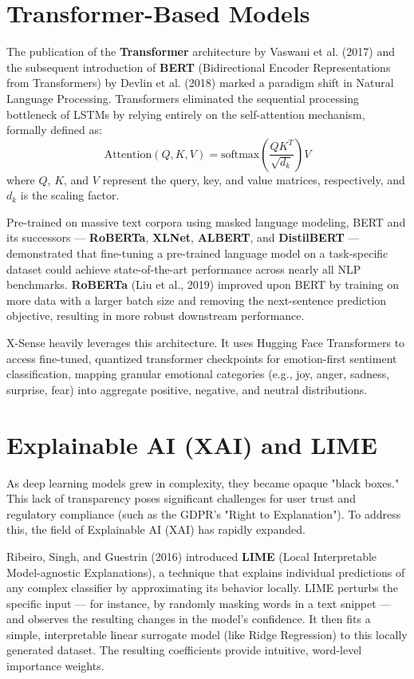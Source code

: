 \documentclass[12pt, a4paper]{report}
\begin{document}
\section{Transformer-Based Models}

The publication of the \textbf{Transformer} architecture by Vaswani et al. (2017) and the subsequent introduction of \textbf{BERT} (Bidirectional Encoder Representations from Transformers) by Devlin et al. (2018) marked a paradigm shift in Natural Language Processing. Transformers eliminated the sequential processing bottleneck of LSTMs by relying entirely on the self-attention mechanism, formally defined as:
$$ \text{Attention}(Q, K, V) = \text{softmax}\left(\frac{QK^T}{\sqrt{d_k}}\right)V $$
where $Q$, $K$, and $V$ represent the query, key, and value matrices, respectively, and $d_k$ is the scaling factor.

Pre-trained on massive text corpora using masked language modeling, BERT and its successors --- \textbf{RoBERTa}, \textbf{XLNet}, \textbf{ALBERT}, and \textbf{DistilBERT} --- demonstrated that fine-tuning a pre-trained language model on a task-specific dataset could achieve state-of-the-art performance across nearly all NLP benchmarks. \textbf{RoBERTa} (Liu et al., 2019) improved upon BERT by training on more data with a larger batch size and removing the next-sentence prediction objective, resulting in more robust downstream performance. 

X-Sense heavily leverages this architecture. It uses Hugging Face Transformers to access fine-tuned, quantized transformer checkpoints for emotion-first sentiment classification, mapping granular emotional categories (e.g., joy, anger, sadness, surprise, fear) into aggregate positive, negative, and neutral distributions.

\section{Explainable AI (XAI) and LIME}

As deep learning models grew in complexity, they became opaque "black boxes." This lack of transparency poses significant challenges for user trust and regulatory compliance (such as the GDPR's "Right to Explanation"). To address this, the field of Explainable AI (XAI) has rapidly expanded.

Ribeiro, Singh, and Guestrin (2016) introduced \textbf{LIME} (Local Interpretable Model-agnostic Explanations), a technique that explains individual predictions of any complex classifier by approximating its behavior locally. LIME perturbs the specific input --- for instance, by randomly masking words in a text snippet --- and observes the resulting changes in the model's confidence. It then fits a simple, interpretable linear surrogate model (like Ridge Regression) to this locally generated dataset. The resulting coefficients provide intuitive, word-level importance weights.
\end{document}
